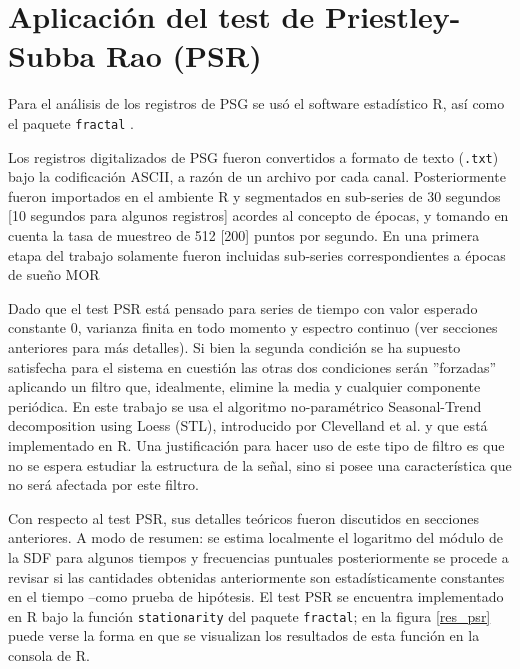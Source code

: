\section{Aplicaci\'on del test de Priestley-Subba Rao (PSR)}

Para el an\'alisis de los registros de PSG se us\'o el software estad\'istico R\cite{R_citar}, 
as\'i como el paquete \texttt{fractal} \cite{R_fractal}.

Los registros digitalizados de PSG fueron convertidos a formato de texto (\texttt{.txt}) bajo
la codificaci\'on ASCII, a raz\'on de un archivo por cada canal. Posteriormente fueron importados
en el ambiente R y segmentados en sub-series de 30 segundos [10 segundos para algunos 
registros] acordes al concepto de \'epocas, y tomando en cuenta la tasa de muestreo de 512 [200]
puntos por segundo. 
En una primera etapa del trabajo solamente fueron incluidas sub-series correspondientes a
\'epocas de sue\~no MOR

Dado que
el test PSR est\'a pensado para
series de tiempo con valor esperado constante 0, varianza finita en todo momento y espectro
continuo (ver secciones anteriores para m\'as detalles). Si bien la 
segunda condici\'on se 
ha supuesto satisfecha para el sistema en cuesti\'on
las otras dos condiciones ser\'an ''forzadas'' aplicando  un
filtro que, idealmente, elimine la media y cualquier componente peri\'odica.
En este trabajo se usa el algoritmo no-param\'etrico Seasonal-Trend decomposition using Loess 
(STL), introducido por Clevelland et al. \cite{Cleveland1990} y que est\'a implementado en R.
Una justificaci\'on para hacer uso de este tipo de filtro es 
que no se espera estudiar la estructura de la se\~nal, sino si posee una caracter\'istica
que no ser\'a afectada por este filtro.

Con respecto al test PSR, sus detalles te\'oricos fueron discutidos en secciones anteriores.
A modo
de resumen: se estima localmente el logaritmo del m\'odulo de la SDF
para algunos tiempos y frecuencias puntuales
posteriormente se procede a revisar
si las cantidades obtenidas anteriormente son estad\'isticamente constantes
en el tiempo --como prueba de hip\'otesis.
El test PSR se encuentra implementado en R bajo la funci\'on \texttt{stationarity}
del paquete \texttt{fractal}; en la figura \ref{res_psr} puede verse la forma en que se
visualizan los resultados de esta funci\'on en la consola de R.

